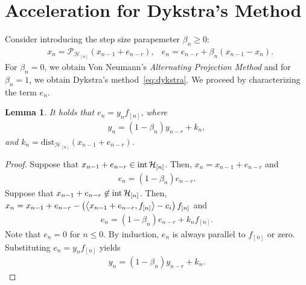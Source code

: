 \documentclass[hidelinks]{article}
\newtheorem{lemma}{Lemma}
\begin{document}
\section{Acceleration for Dykstra's Method}
%
Consider introducing the step size parapemeter $\beta_n\geq 0$:
\begin{align}\label{eq:dykstramodif}
&x_n=\mathcal{P}_{\mathcal{H}_{[n]}}\left(x_{n-1}+e_{n-r}\right),
&e_n=e_{n-r}+\beta_n(x_{n-1}-x_n).
\end{align}
For $\beta_n=0$, we obtain Von Neumann's \emph{Alternating Projection Method} and for $\beta_n=1$, we obtain Dykstra's method~\eqref{eq:dykstra}. We proceed by characterizing the term $e_n$.
\begin{lemma}
It holds that $e_n=y_n f_{[n]}$, where
\begin{align*}
y_n = (1-\beta_n)y_{n-r} +k_n,
\end{align*}
and $k_n=\text{dist}_{\mathcal{H}_{[n]}}(x_{n-1}+e_{n-r})$.
\end{lemma}
\begin{proof}
Suppose that $x_{n-1}+e_{n-r}\in\operatorname*{int}\mathcal{H}_{[n]}$. Then, $x_n=x_{n-1}+e_{n-r}$ and
\begin{align*}
e_n=(1-\beta_n)e_{n-r}.
\end{align*}
Suppose that $x_{n-1}+e_{n-r}\not\in\operatorname*{int}\mathcal{H}_{[n]}$. Then, $x_n=x_{n-1}+e_{n-r}-\left(\left\langle x_{n-1}+e_{n-r} , f_{[n]} \right\rangle - c_i\right)f_{[n]}$ and
\begin{align*}
e_n=(1-\beta_n)e_{n-r}+k_nf_{[n]}.
\end{align*}
Note that $e_n=0$ for $n\leq 0$. By induction, $e_n$ is always parallel to $f_{[n]}$ or zero. Substituting $e_n=y_nf_{[n]}$ yields
\begin{align*}
y_n=(1-\beta_n)y_{n-r}+k_n.
\end{align*} 
\end{proof}



\end{document}

